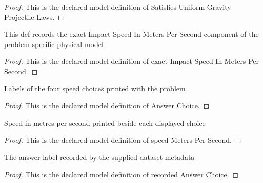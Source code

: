 \begin{proof}
  This is the declared model definition of Satisfies Uniform Gravity Projectile Laws.
\end{proof}
\begin{definition}
  \label{def:physics:phyx-mini-0686:phyxminiproblems-problemphyxmini0686-exactimpactspeedinmeterspersecond}
  This def records the exact Impact Speed In Meters Per Second component of the problem-specific physical model
\end{definition}
\begin{proof}
  This is the declared model definition of exact Impact Speed In Meters Per Second.
\end{proof}
\begin{definition}
  \label{def:physics:phyx-mini-0686:phyxminiproblems-problemphyxmini0686-answerchoice}
  Labels of the four speed choices printed with the problem
\end{definition}
\begin{proof}
  This is the declared model definition of Answer Choice.
\end{proof}
\begin{definition}
  \label{def:physics:phyx-mini-0686:phyxminiproblems-problemphyxmini0686-answerchoice-speedmeterspersecond}
  Speed in metres per second printed beside each displayed choice
\end{definition}
\begin{proof}
  This is the declared model definition of speed Meters Per Second.
\end{proof}
\begin{definition}
  \label{def:physics:phyx-mini-0686:phyxminiproblems-problemphyxmini0686-recordedanswerchoice}
  The answer label recorded by the supplied dataset metadata
\end{definition}
\begin{proof}
  This is the declared model definition of recorded Answer Choice.
\end{proof}

